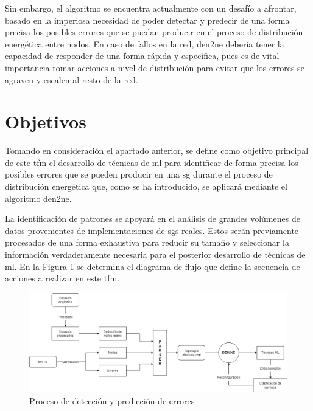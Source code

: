 
\pagebreak

Sin embargo, el algoritmo se encuentra actualmente con un desafío a afrontar, basado en la imperiosa necesidad de poder detectar y predecir de una forma precisa los posibles errores que se puedan producir en el proceso de distribución energética entre nodos. En caso de fallos en la red, \gls{den2ne} debería tener la capacidad de responder de una forma rápida y específica, pues es de vital importancia tomar acciones a nivel de distribución para evitar que los errores se agraven y escalen al resto de la red.

\vspace{3mm}



\section{Objetivos}
\label{sec:obj}

Tomando en consideración el apartado anterior, se define como objetivo principal de este \gls{tfm} el desarrollo de técnicas de \gls{ml} para identificar de forma precisa los posibles errores que se pueden producir en una \gls{sg} durante el proceso de distribución energética que, como se ha introducido, se aplicará mediante el algoritmo \gls{den2ne}. 

\vspace{3mm}

La identificación de patrones se apoyará en el análisis de grandes volúmenes de datos provenientes de implementaciones de \gls{sg}s reales. Estos serán previamente procesados de una forma exhaustiva para reducir su tamaño y seleccionar la información verdaderamente necesaria para el posterior desarrollo de técnicas de \gls{ml}. En la Figura \ref{fig:intro} se determina el diagrama de flujo que define la secuencia de acciones a realizar en este \gls{tfm}.

\vspace{3mm}

\begin{figure}[h!]
    \centering
    \includegraphics[width=1\textwidth]{img/intro/anteproyecto.drawio.png}
    \caption{Proceso de detección y predicción de errores}
    \label{fig:intro}
\end{figure}

